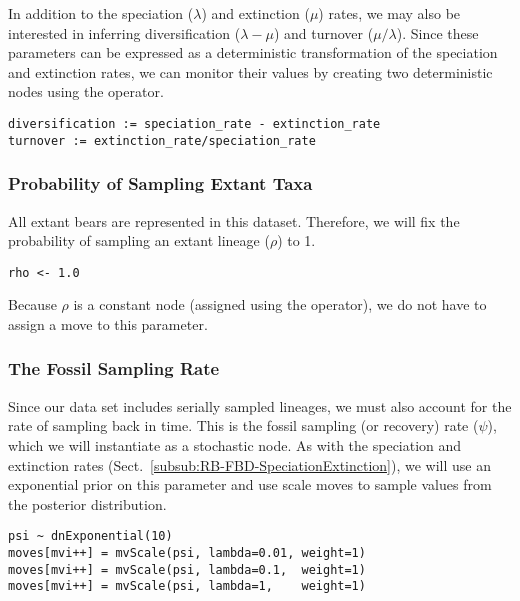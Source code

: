 In addition to the speciation ($\lambda$) and extinction ($\mu$) rates, we may also be interested in inferring diversification ($\lambda - \mu$) and turnover ($\mu/\lambda$).
Since these parameters can be expressed as a deterministic transformation of the speciation and extinction rates, we can monitor their values by creating two deterministic nodes using the \cl{:=} operator.
{\tt \begin{snugshade*}
\begin{lstlisting}
diversification := speciation_rate - extinction_rate
turnover := extinction_rate/speciation_rate
\end{lstlisting}
\end{snugshade*}}

\subsubsection{Probability of Sampling Extant Taxa}\label{subsub:RB-FBD-Rho}

All extant bears are represented in this dataset. 
Therefore, we will fix the probability of sampling an extant lineage ($\rho$) to 1.
{\tt \begin{snugshade*}
\begin{lstlisting}
rho <- 1.0
\end{lstlisting}
\end{snugshade*}}
Because $\rho$ is a constant node (assigned using the \cl{<-} operator), we do not have to assign a move to this parameter.

\subsubsection{The Fossil Sampling Rate}\label{subsub:RB-FBD-Psi}

Since our data set includes serially sampled lineages, we must also account for the rate of sampling back in time. 
This is the fossil sampling (or recovery) rate ($\psi$), which we will instantiate as a stochastic node. 
As with the speciation and extinction rates (Sect.\ \ref{subsub:RB-FBD-SpeciationExtinction}), we will use an exponential prior on this parameter and use scale moves to sample values from the posterior distribution.
{\tt \begin{snugshade*}
\begin{lstlisting}
psi ~ dnExponential(10) 
moves[mvi++] = mvScale(psi, lambda=0.01, weight=1)
moves[mvi++] = mvScale(psi, lambda=0.1,  weight=1)
moves[mvi++] = mvScale(psi, lambda=1,    weight=1)
\end{lstlisting}
\end{snugshade*}}

